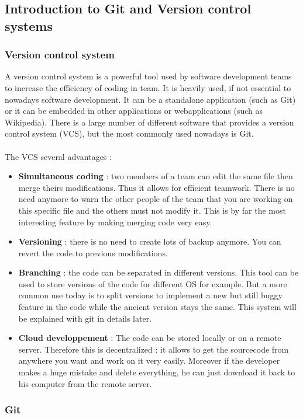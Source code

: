 \documentclass[a4paper]{report}
\begin{document}
\subsection{Introduction to Git and Version control systems}
\subsubsection{Version control system}
A version control system is a powerful tool used by software development teams to increase the efficiency of coding in team. It is heavily used, if not essential to nowadays software development. It can be a standalone application (such as Git) or it can be embedded in other applications or webapplications (such as Wikipedia). There is a large number of different software that provides a version control system (VCS), but the most commonly used nowadays is Git.\\
\\
The VCS several advantages : 
\begin{itemize}
	\item \textbf{Simultaneous coding} : two members of a team can edit the same file then merge theirs modifications. Thus it allows for efficient teamwork. There is no need anymore to warn the other people of the team that you are working on this specific file and the others must not modify it. This is by far the most interesting feature by making merging code very easy.
    \item \textbf{Versioning} : there is no need to create lots of backup anymore. You can revert the code to previous modifications.
    \item \textbf{Branching} : the code can be separated in different versions. This tool can be used to store versions of the code for different OS for example. But a more common use today is to split versions to implement a new but still buggy feature in the code while the ancient version stays the same. This system will be explained with git in details later.
    \item \textbf{Cloud developpement} : The code can be stored locally or on a remote server. Therefore this is decentralized : it allows to get the sourcecode from anywhere you want and work on it very easily. Moreover if the developer makes a huge mistake and delete everything, he can just download it back to his computer from the remote server. 
\end{itemize}

\subsubsection{Git}
\end{document}
